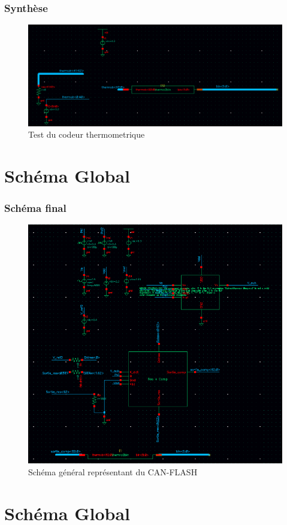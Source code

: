 \documentclass{beamer}
\begin{document}
\begin{frame}
\frametitle{Synth\`ese}

\begin{figure}[!htb]
  \includegraphics[width=0.8\linewidth]{test_thermo2bin.png}
  \caption{Test du codeur thermometrique}
\end{figure}

\end{frame}


\section{Sch\'ema Global}

\begin{frame}
\frametitle{Sch\'ema final}

\begin{figure}[!htb]
  \includegraphics[width=0.6\linewidth]{schema_final.png}
  \caption{Sch\'ema g\'en\'eral repr\'esentant du CAN-FLASH}
\end{figure}

\end{frame}


\section{Sch\'ema Global}
\end{document}
